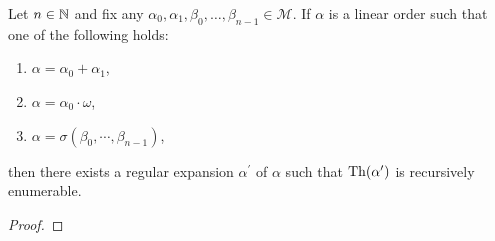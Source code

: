 \begin{prp}
	Let $n\in\mathbb{N}$ and fix any $\alpha_0,\alpha_1,\beta_0,\dotsc,\beta_{n-1}\in\mathcal{M}$.  If $\alpha$ is a linear order such that one of the following holds:
	\begin{enumerate}
		\item	$\alpha=\alpha_0+\alpha_1$,
		\item	$\alpha=\alpha_0\cdot\omega$,
		\item	$\alpha=\sigma(\beta_0,\cdots,\beta_{n-1})$,
	\end{enumerate}
	then there exists a regular expansion $\alpha^\prime$ of $\alpha$ such that $\operatorname{Th}(\alpha^\prime)$ is recursively enumerable.
\end{prp}
\begin{proof}
\end{proof}

